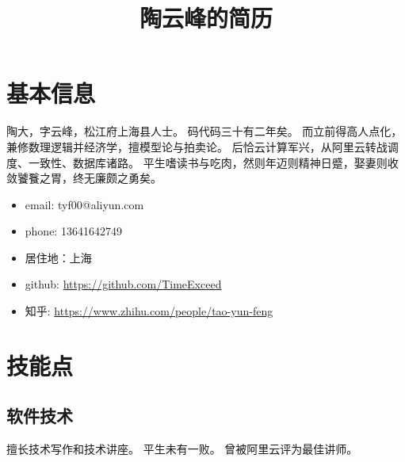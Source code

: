\documentclass[scheme=plain]{ctexart}
\title{陶云峰的简历}
\begin{document}
\maketitle

\section{基本信息}

陶大，字云峰，松江府上海县人士。
码代码三十有二年矣。
而立前得高人点化，兼修数理逻辑并经济学，擅模型论与拍卖论。
后恰云计算军兴，从阿里云转战调度、一致性、数据库诸路。
平生嗜读书与吃肉，然则年迈则精神日蹙，娶妻则收敛饕餮之胃，终无廉颇之勇矣。

\begin{itemize}
    \item email: tyf00@aliyun.com
    \item phone: 13641642749
    \item 居住地：上海
    \item github: \url{https://github.com/TimeExceed}
    \item 知乎: \url{https://www.zhihu.com/people/tao-yun-feng}
\end{itemize}

\section{技能点}

\subsection{软件技术}

擅长技术写作和技术讲座。
平生未有一败。
曾被阿里云评为最佳讲师。
\end{document}
